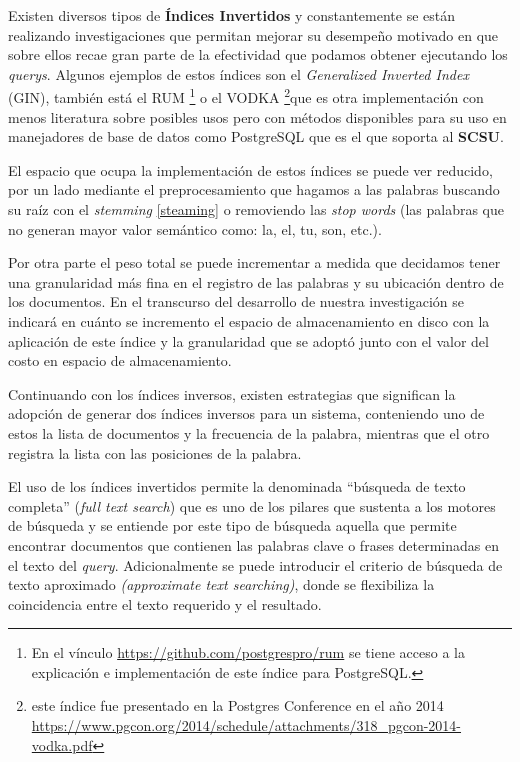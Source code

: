\documentclass[
  10,
  openany]{book}
\begin{document}
Existen diversos tipos de \textbf{Índices Invertidos} y constantemente se están realizando investigaciones que permitan mejorar su desempeño motivado en que sobre ellos recae gran parte de la efectividad que podamos obtener ejecutando los \emph{querys}. Algunos ejemplos de estos índices son el \emph{Generalized Inverted Index} (GIN), también está el RUM \footnote{En el vínculo \url{https://github.com/postgrespro/rum} se tiene acceso a la explicación e implementación de este índice para PostgreSQL.} o el VODKA \footnote{este índice fue presentado en la Postgres Conference en el año 2014 \url{https://www.pgcon.org/2014/schedule/attachments/318_pgcon-2014-vodka.pdf}}que es otra implementación con menos literatura sobre posibles usos pero con métodos disponibles para su uso en manejadores de base de datos como PostgreSQL que es el que soporta al \textbf{SCSU}.

El espacio que ocupa la implementación de estos índices se puede ver reducido, por un lado mediante el preprocesamiento que hagamos a las palabras buscando su raíz con el \emph{stemming} \ref{steaming} o removiendo las \emph{stop words} (las palabras que no generan mayor valor semántico como: la, el, tu, son, etc.).

Por otra parte el peso total se puede incrementar a medida que decidamos tener una granularidad más fina en el registro de las palabras y su ubicación dentro de los documentos. En el transcurso del desarrollo de nuestra investigación se indicará en cuánto se incremento el espacio de almacenamiento en disco con la aplicación de este índice y la granularidad que se adoptó junto con el valor del costo en espacio de almacenamiento.

Continuando con los índices inversos, existen estrategias que significan la adopción de generar dos índices inversos para un sistema, conteniendo uno de estos la lista de documentos y la frecuencia de la palabra, mientras que el otro registra la lista con las posiciones de la palabra.

El uso de los índices invertidos permite la denominada ``búsqueda de texto completa'' (\emph{full text search}) que es uno de los pilares que sustenta a los motores de búsqueda y se entiende por este tipo de búsqueda aquella que permite encontrar documentos que contienen las palabras clave o frases determinadas en el texto del \emph{query}. Adicionalmente se puede introducir el criterio de búsqueda de texto aproximado \emph{(approximate text searching)}, donde se flexibiliza la coincidencia entre el texto requerido y el resultado.
\end{document}
